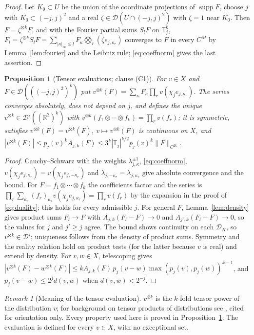 \documentclass[11pt]{article}
\theoremstyle{plain}
\newtheorem{proposition}[theorem]{Proposition}
\theoremstyle{definition}
\theoremstyle{remark}
\newtheorem{remark}[theorem]{Remark}
\newcommand{\R}{\mathbb{R}}
\newcommand{\T}{\mathbb{T}}
\newcommand{\cD}{\mathcal{D}}
\newcommand{\conj}[1]{\overline{#1}}
\DeclareMathOperator{\supp}{supp}
\begin{document}
\begin{proof}
Let $K_0\subset U$ be the union of the coordinate projections of $\supp F$, choose $j$
with $K_0\subset(-j,j)^{2}$ and a real $\zeta\in\cD(U\cap(-j,j)^{2})$ with $\zeta=1$ near $K_0$. Then
$F=\zeta^{\otimes k}F$, and with the Fourier partial sums $S_lF$ on $\T_j^{k}$,
$F_l=\zeta^{\otimes k}S_lF=\sum_{|\kappa|_\infty\le l}F_\kappa\bigotimes_r(\zeta e_{j,\kappa_r})$ converges to $F$ in every
$C^{M}$ by Lemma~\ref{lem:fourier} and the Leibniz rule; \eqref{eq:coeffnorm} gives the
last assertion.
\end{proof}

\begin{proposition}[Tensor evaluations; clause (C1)]\label{prop:tensor}
For $v\in X$ and $F\in\cD(((-j,j)^{2})^{k})$ put
$v^{\otimes k}(F)=\sum_\kappa F_\kappa\prod_rv(\chi_je_{j,\kappa_r})$. The series converges absolutely, does
not depend on $j$, and defines the unique $v^{\otimes k}\in\cD'((\R^{2})^{k})$ with
$v^{\otimes k}(f_1\otimes\cdots\otimes f_k)=\prod_rv(f_r)$; it is symmetric, satisfies
$\conj{v^{\otimes k}(F)}=v^{\otimes k}(\conj F)$, $v\mapsto v^{\otimes k}(F)$ is continuous on $X$, and
$|v^{\otimes k}(F)|\le p_j(v)^{k}A_{j,k}(F)\le3^{k}|\T_j|^{k/2}p_j(v)^{k}\|F\|_{C^{2k}}$.
\end{proposition}

\begin{proof}
Cauchy--Schwarz with the weights $\lambda_{j,\kappa}^{\pm1}$, \eqref{eq:coeffnorm},
$v(\chi_je_{j,\kappa_r})=v(\chi_j\conj{e_{j,-\kappa_r}})$ and $\lambda_{j,-\kappa_r}=\lambda_{j,\kappa_r}$ give absolute
convergence and the bound. For $F=f_1\otimes\cdots\otimes f_k$ the coefficients factor and the
series is $\prod_r\sum_{\kappa_r}(f_r)_{\kappa_r}v(\chi_je_{j,\kappa_r})=\prod_rv(f_r)$ by the expansion in the
proof of \eqref{eq:duality}; this holds for every admissible $j$. For general $F$,
Lemma~\ref{lem:density} gives product sums $F_l\to F$ with
$A_{j,k}(F_l-F)\to0$ and $A_{j',k}(F_l-F)\to0$, so the values for $j$ and $j'\ge j$ agree. The
bound shows continuity on each $\cD_K$, so $v^{\otimes k}\in\cD'$; uniqueness follows from the
density of product sums. Symmetry and the reality relation hold on product
tests (for the latter because $v$ is real) and extend by density. For $v,w\in X$,
telescoping gives
$|v^{\otimes k}(F)-w^{\otimes k}(F)|\le kA_{j,k}(F)\,p_j(v-w)\max(p_j(v),p_j(w))^{k-1}$, and
$p_j(v-w)\le2^{j}d(v,w)$ when $d(v,w)<2^{-j}$.
\end{proof}

\begin{remark}[Meaning of the tensor evaluation]\label{rem:tensor-meaning}
$v^{\otimes k}$ is the $k$-fold tensor power of the distribution $v$; for background on
tensor products of distributions see \cite{Zou2022Math218}, cited for orientation
only. Every property used here is proved in Proposition~\ref{prop:tensor}. The
evaluation is defined for every $v\in X$, with no exceptional set.
\end{remark}
\end{document}
